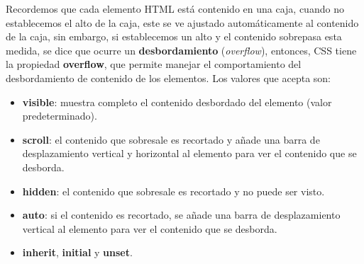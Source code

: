 Recordemos que cada elemento HTML está contenido en una caja, cuando no establecemos el alto de la caja, este se ve ajustado automáticamente al contenido de la caja, sin embargo, si establecemos un alto y el contenido sobrepasa esta medida, se dice que ocurre un \textbf{desbordamiento} (\textit{overflow}), entonces, CSS tiene la propiedad \textbf{overflow}, que permite manejar el comportamiento del desbordamiento de contenido de los elementos. Los valores que acepta son:
\begin{itemize}
    \item \textbf{visible}: muestra completo el contenido desbordado del elemento (valor predeterminado).
    \item \textbf{scroll}: el contenido que sobresale es recortado y añade una barra de desplazamiento vertical y horizontal al elemento para ver el contenido que se desborda.
    \item \textbf{hidden}: el contenido que sobresale es recortado y no puede ser visto.
    \item \textbf{auto}: si el contenido es recortado, se añade una barra de desplazamiento vertical al elemento para ver el contenido que se desborda.
    \item \textbf{inherit}, \textbf{initial} y \textbf{unset}.
\end{itemize}

